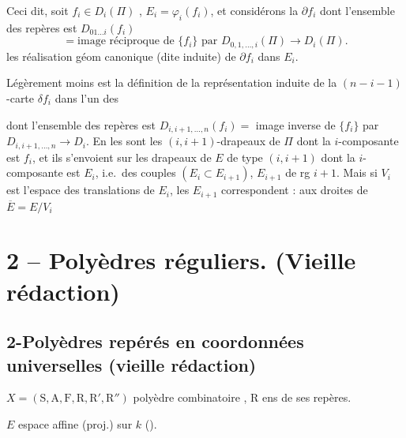 \documentclass[11pt,a4paper]{article}
\begin{document}
Ceci dit, soit $f_i\in D_i(\Pi)$ , $E_i=\varphi_i(f_i)$, et considérons la  $\partial f_i$ dont l'ensemble des repères est $D_{01\dots i}(f_i)$
\[
= \text{image réciproque de } \{f_i\} \text{ par } D_{0,1,\dots,i}(\Pi)\to D_i(\Pi).
\]
 les    réalisation géom canonique (dite \og induite\fg) de $\partial f_i$ dans $E_i$.

Légèrement moins  est la définition de la représentation induite de la $(n-i-1)$-carte $\delta f_i$ dans l'un des

\ill{} dont l'ensemble des repères est $D_{i,i+1,\dots,n}(f_i)=$ image inverse de $\{f_i\}$ par $D_{i,i+1,\dots,n}\to D_i$. En les  sont les \struck{\ill{}} $(i,i+1)$-drapeaux de $\Pi$ dont la $i$-composante est $f_i$, et ils s'envoient sur les drapeaux de $E$ de type $(i,i+1)$ dont la $i$-composante est $E_i$, \struck{\ill{}} i.e.\ des couples $(E_i\subset E_{i+1})$, $E_{i+1}$ de rg $i+1$. Mais si $V_i$ est l'espace des translations de $E_i$, les $E_{i+1}$ correspondent : aux droites de $\overline{E}=E/V_i$

\section*{2 -- Polyèdres réguliers. (Vieille rédaction)}

\subsection*{2-Polyèdres repérés en coordonnées universelles (vieille rédaction)}

$X=(\mathrm{S},\mathrm{A},\mathrm{F},\mathrm{R},\mathrm{R}',\mathrm{R}'')$ polyèdre combinatoire \uncertain{(\ill{})}, $\mathrm{R}$ ens de ses repères.

$E$ espace affine (proj.) sur $k$ ().
\end{document}

